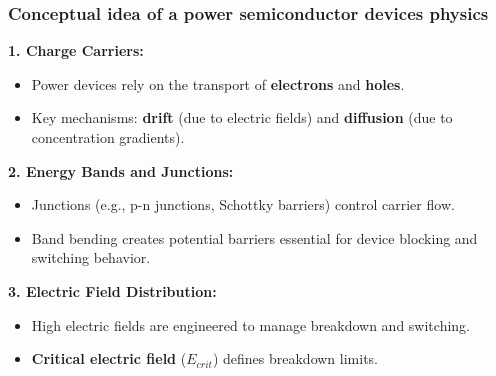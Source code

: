 \begin{frame}
	\frametitle{Conceptual idea of a power semiconductor devices physics}
    \textbf{1. Charge Carriers:} 
    \begin{itemize}
        \item Power devices rely on the transport of \textbf{electrons} and \textbf{holes}.
        \item Key mechanisms: \textbf{drift} (due to electric fields) and \textbf{diffusion} (due to concentration gradients).
    \end{itemize}

    \textbf{2. Energy Bands and Junctions:}
    \begin{itemize}
        \item Junctions (e.g., p-n junctions, Schottky barriers) control carrier flow.
        \item Band bending creates potential barriers essential for device blocking and switching behavior.
    \end{itemize}

    \textbf{3. Electric Field Distribution:}
    \begin{itemize}
        \item High electric fields are engineered to manage breakdown and switching.
        \item \textbf{Critical electric field} (\( E_{crit} \)) defines breakdown limits.
    \end{itemize}
\end{frame}


